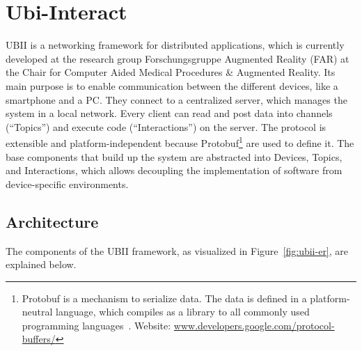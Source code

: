 \section{Ubi-Interact}\label{section:ubi-interact}

\gls{UBII} is a networking framework for distributed applications, which is currently developed at the research group Forschungsgruppe Augmented Reality (FAR) at the Chair for Computer Aided Medical Procedures \& Augmented Reality. Its main purpose is to enable communication between the different devices, like a smartphone and a \gls{PC}. They connect to a centralized server, which manages the system in a local network. Every client can read and post data into channels (\enquote{Topics}) and execute code (\enquote{Interactions}) on the server. The protocol is extensible and platform-independent because \gls{Protobuf}\footnote{Protobuf is a mechanism to serialize data. The data is defined in a platform-neutral language, which compiles as a library to all commonly used programming languages~\cite{GoogleLLC.2019b}. Website: \href{https://developers.google.com/protocol-buffers/}{www.developers.google.com/protocol-buffers/}} are used to define it. The base components that build up the system are abstracted into Devices, Topics, and Interactions, which allows decoupling the implementation of software from device-specific environments.


\subsection{Architecture}\label{subsection:architecture}

The components of the \gls{UBII} framework, as visualized in Figure~\ref{fig:ubii-er}, are explained below.

